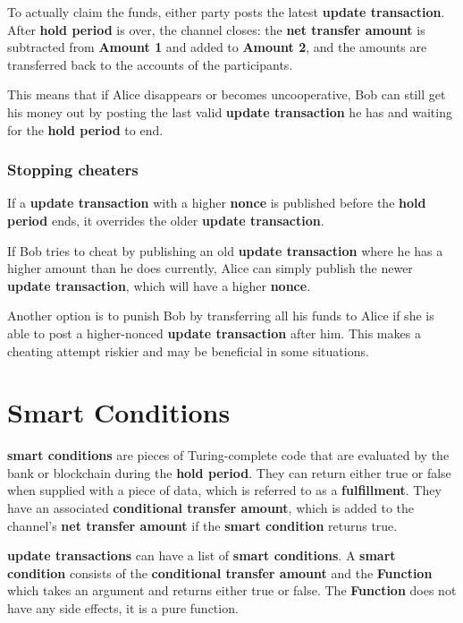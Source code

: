 \documentclass[a4paper]{article}
\newcommand{\bgls}[1]{\textbf{\gls{#1}}}
\newcommand{\bglspl}[1]{\textbf{\glspl{#1}}}
\begin{document}
To actually claim the funds, either party posts the latest \bgls{update transaction}. After \bgls{hold period} is over, the channel closes: the \bgls{net transfer amount} is subtracted from \textbf{Amount 1} and added to \textbf{Amount 2}, and the amounts are transferred back to the accounts of the participants.

This means that if Alice disappears or becomes uncooperative, Bob can still get his money out by posting the last valid \bgls{update transaction} he has and waiting for the \bgls{hold period} to end.

\subsubsection{Stopping cheaters}

If a \bgls{update transaction} with a higher \bgls{nonce} is published before the \bgls{hold period} ends, it overrides the older \bgls{update transaction}.

If Bob tries to cheat by publishing an old \bgls{update transaction} where he has a higher amount than he does currently, Alice can simply publish the newer \bgls{update transaction}, which will have a higher \bgls{nonce}.

Another option is to punish Bob by transferring all his funds to Alice if she is able to post a higher-nonced \bgls{update transaction} after him. This makes a cheating attempt riskier and may be beneficial in some situations.

\section{Smart Conditions}

\bglspl{smart condition} are pieces of Turing-complete code that are evaluated by the bank or blockchain during the \bgls{hold period}. They can return either true or false when supplied with a piece of data, which is referred to as a \bgls{fulfillment}. They have an associated \bgls{conditional transfer amount}, which is added to the channel's \bgls{net transfer amount} if the \bgls{smart condition} returns true.

\bglspl{update transaction} can have a list of \bglspl{smart condition}. A \bgls{smart condition} consists of the \bgls{conditional transfer amount} and the \textbf{Function} which takes an argument and returns either true or false. The \textbf{Function} does not have any side effects, it is a pure function.
\end{document}
